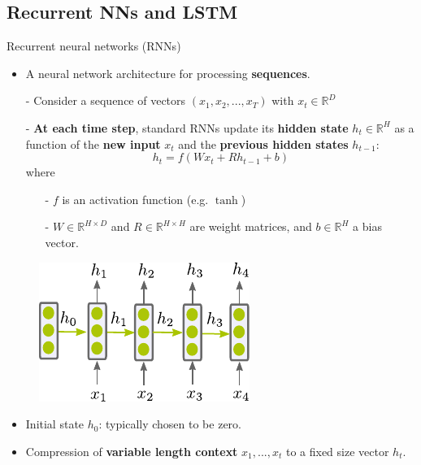 
\subsection{Recurrent NNs and LSTM}
\begin{frame}{Recurrent neural networks (RNNs)}
\vspace{-3mm}
\begin{itemize}
\item A neural network architecture for processing \textbf{sequences}.
\item[-] Consider a sequence of vectors $(x_1, x_2, ..., x_T)$ with $x_t \in \mathbb{R}^D$
\end{itemize}
\begin{itemize}
\item[-] \textbf{At each time step}, standard RNNs update its \textbf{hidden state} $h_t \in \mathbb{R}^H$ as a function of the \textbf{new input} $x_t$ and the \textbf{previous hidden states} $h_{t-1}$:
\[
h_t = f(W x_t + R h_{t-1} + b)
\]
where
\begin{itemize}
\item[-] $f$ is an activation function (e.g. $\tanh$)
\item[-] $W \in \mathbb{R}^{H \times D}$ and $R  \in \mathbb{R}^{H \times H}$
 are weight matrices, and $b \in \mathbb{R}^H$ a bias vector. 
\end{itemize}
\end{itemize}
\begin{figure}
                        \centering
                        \includegraphics[width=.25\linewidth]{./figures/rnn.pdf}
\end{figure}
\begin{itemize}
\item Initial state $h_0$: typically chosen to be zero.
\item Compression of \textbf{variable length context} $x_1, ..., x_{t}$ to a fixed size vector $h_t$.
\end{itemize}
\end{frame}



